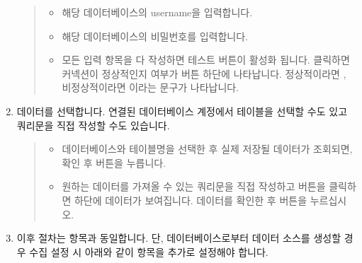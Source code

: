 \documentclass[letterpaper,10pt,english]{sphinxmanual}
\begin{document}
\begin{enumerate}
\begin{quote}
\begin{itemize}
\item {} 
 해당 데이터베이스의 username을 입력합니다.

\item {} 
 해당 데이터베이스의 비밀번호를 입력합니다.

\item {} 
 모든 입력 항목을 다 작성하면 테스트 버튼이 활성화 됩니다. 클릭하면 커넥션이 정상적인지 여부가 버튼 하단에 나타납니다. 정상적이라면 , 비정상적이라면 이라는 문구가 나타납니다.

\end{itemize}
\end{quote}

\item {} 
데이터를 선택합니다. 연결된 데이터베이스 계정에서 테이블을 선택할 수도 있고 쿼리문을 직접 작성할 수도 있습니다.
\begin{quote}

\begin{figure}[H]
\centering

\noindent{}
\end{figure}
\begin{itemize}
\item {} 
 데이터베이스와 테이블명을 선택한 후 실제 저장될 데이터가 조회되면, 확인 후  버튼을 누릅니다.

\item {} 
 원하는 데이터를 가져올 수 있는 쿼리문을 직접 작성하고  버튼을 클릭하면 하단에 데이터가 보여집니다. 데이터를 확인한 후  버튼을 누르십시오.

\end{itemize}
\end{quote}

\item {} 
이후 절차는 {\hyperref[\detokenize{discovery/part02/create_a_data_source:create-datasource-from-file}]{}} 항목과 동일합니다. 단, 데이터베이스로부터 데이터 소스를 생성할 경우 수집 설정 시 아래와 같이  항목을 추가로 설정해야 합니다.
\begin{quote}

\begin{figure}[H]
\centering


\end{figure}
\end{quote}
\end{enumerate}
\end{document}
